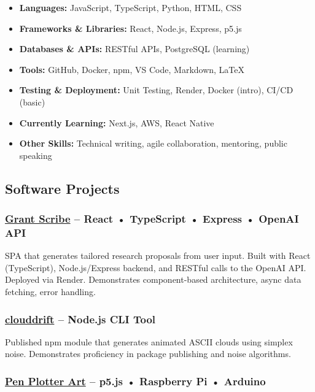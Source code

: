 \documentclass[11pt,a4paper]{article}
\providecommand{\tightlist}{%
  \setlength{\itemsep}{0pt}\setlength{\parskip}{0pt}}
\begin{document}
\begin{itemize}
\tightlist
\item
  \textbf{Languages:} JavaScript, TypeScript, Python, HTML, CSS
\item
  \textbf{Frameworks \& Libraries:} React, Node.js, Express, p5.js
\item
  \textbf{Databases \& APIs:} RESTful APIs, PostgreSQL (learning)
\item
  \textbf{Tools:} GitHub, Docker, npm, VS Code, Markdown, LaTeX
\item
  \textbf{Testing \& Deployment:} Unit Testing, Render, Docker (intro),
  CI/CD (basic)
\item
  \textbf{Currently Learning:} Next.js, AWS, React Native
\item
  \textbf{Other Skills:} Technical writing, agile collaboration,
  mentoring, public speaking
\end{itemize}

\subsection{Software Projects}\label{software-projects}

\subsubsection{\texorpdfstring{\href{https://github.com/thrly/grant-scribe}{Grant
Scribe} -- React • TypeScript • Express • OpenAI
API}{Grant Scribe -- React • TypeScript • Express • OpenAI API}}\label{grant-scribe-react-typescript-express-openai-api}

SPA that generates tailored research proposals from user input. Built
with React (TypeScript), Node.js/Express backend, and RESTful calls to
the OpenAI API. Deployed via Render. Demonstrates component-based
architecture, async data fetching, error handling.

\subsubsection{\texorpdfstring{\href{https://github.com/thrly/clouddrift}{clouddrift}
-- Node.js CLI
Tool}{clouddrift -- Node.js CLI Tool}}\label{clouddrift-node.js-cli-tool}

Published npm module that generates animated ASCII clouds using simplex
noise. Demonstrates proficiency in package publishing and noise
algorithms.

\subsubsection{\texorpdfstring{\href{https://github.com/thrly/pen-plotter-art}{Pen
Plotter Art} -- p5.js • Raspberry Pi •
Arduino}{Pen Plotter Art -- p5.js • Raspberry Pi • Arduino}}\label{pen-plotter-art-p5.js-raspberry-pi-arduino}
\end{document}
